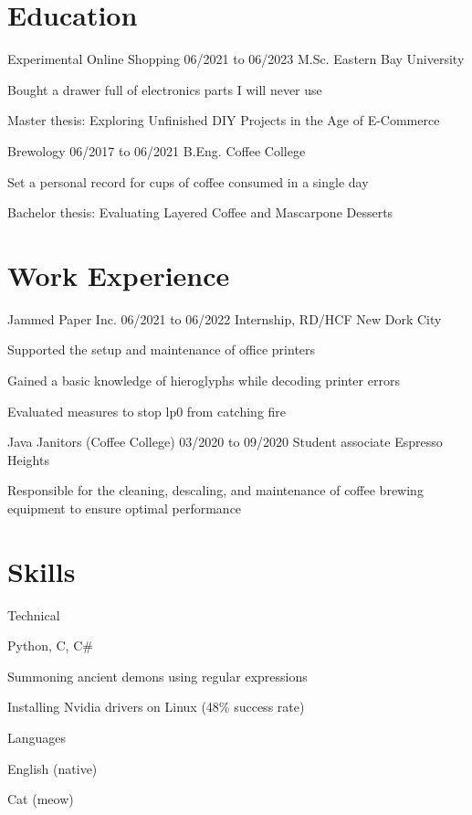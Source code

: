 \section{Education}
\begin{resumeList}	{Experimental Online Shopping}{}	{06/2021 to 06/2023}
					{M.Sc.}								{Eastern Bay University}
	\item Bought a drawer full of electronics parts I will never use
	\item Master thesis: Exploring Unfinished DIY Projects in the Age of E-Commerce
\end{resumeList}
\begin{resumeList}	{Brewology}{}	{06/2017 to 06/2021}
					{B.Eng.}		{Coffee College}
	\item Set a personal record for cups of coffee consumed in a single day
	\item Bachelor thesis: Evaluating Layered Coffee and Mascarpone Desserts
\end{resumeList}


\section{Work Experience}
\begin{resumeList}	{Jammed Paper Inc.}{}	{06/2021 to 06/2022}
					{Internship, RD/HCF}	{New Dork City}
	\item Supported the setup and maintenance of office printers
	\item Gained a basic knowledge of hieroglyphs while decoding printer errors
	\item Evaluated measures to stop lp0 from catching fire
\end{resumeList}
\begin{resumeList}	{Java Janitors (Coffee College)}{}	{03/2020 to 09/2020}
					{Student associate}					{Espresso Heights}
	\item Responsible for the cleaning, descaling, and maintenance of coffee brewing equipment to ensure optimal performance
\end{resumeList}


\section{Skills}
\begin{resumeList}{Technical}{}{}{}{}
	\item Python, C, C\#
	\item Summoning ancient demons using regular expressions
	\item Installing Nvidia drivers on Linux (48\% success rate)
\end{resumeList}

\begin{resumeList}{Languages}{}{}{}{}
	\item English (native)
	\item Cat (meow)
\end{resumeList}
